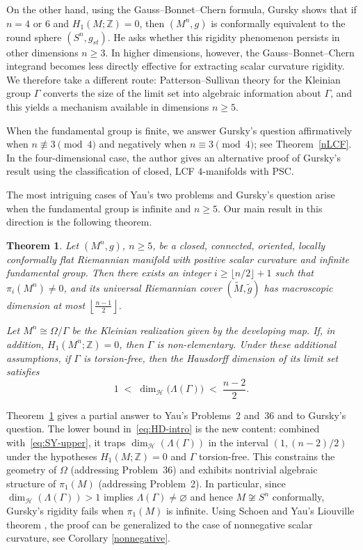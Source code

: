 \documentclass[12pt,oneside,a4paper]{article}
\newtheorem{theoremA}{Theorem}
\theoremstyle{mytheorem}
\theoremstyle{remark}
\theoremstyle{definition}
\begin{document}
On the other hand, using the Gauss--Bonnet--Chern formula, Gursky
\cite{zbMATH00750638} shows that if \(n=4\) or \(6\)
and \(H_1(M;\mathbb Z)=0\), then
\((M^n,g)\) is conformally equivalent to the round sphere
\((S^n,g_{st})\).  He asks whether this rigidity phenomenon
persists in other dimensions \(n\ge3\).  In higher dimensions, however,
the Gauss--Bonnet--Chern integrand becomes less directly effective for
extracting scalar curvature rigidity.  We therefore take a different
route: Patterson--Sullivan theory for the Kleinian group
\(\Gamma\) converts the size of the limit set into algebraic information
about \(\Gamma\), and this yields a mechanism available in dimensions
\(n\geq5\).

When the fundamental group is finite, we answer Gursky's question affirmatively when \(n\not\equiv3\pmod4\) and negatively when \(n\equiv3\pmod4\); see Theorem~\ref{nLCF}.
In the four-dimensional case, the author \cite[p.~12]{2025arXiv251213528D} gives an alternative proof of Gursky's result using the classification of closed, LCF $4$-manifolds with PSC.

The most intriguing cases of Yau's two problems and Gursky's question arise when the fundamental group is infinite and $n \ge 5$. Our main result in this direction is the following theorem.


\begin{theoremA}\label{thm:intro-A}
Let $(M^n,g)$, $n\geq5$, be a closed, connected, oriented, locally conformally
flat Riemannian manifold with positive scalar curvature and infinite
fundamental group.  Then there exists an integer
$i\ge\lfloor n/2\rfloor+1$ such that $\pi_i(M^n)\ne 0$, and its universal Riemannian cover $(\widetilde M,\widetilde g)$ has macroscopic dimension at most $\left\lfloor\frac{n-1}{2}\right\rfloor$.  
 
Let $M^n\cong\Omega/\Gamma$ be the Kleinian realization given by the
 developing map.  If, in addition,
$H_1(M^n;\mathbb{Z})=0$, then $\Gamma$ is
non-elementary.  Under these additional assumptions, if $\Gamma$ is
torsion-free, then the Hausdorff dimension of its limit set satisfies
\begin{equation}\label{eq:HD-intro}
        1\;<\;\dim_{\mathcal H}\!\bigl(\Lambda(\Gamma)\bigr)\;<\;\frac{n-2}{2}.
\end{equation}
\end{theoremA}

Theorem~\ref{thm:intro-A} gives a partial answer to Yau's Problems~2 and~36 and to
Gursky's question.  The lower bound in~\eqref{eq:HD-intro} is the new
content: combined with~\eqref{eq:SY-upper}, it traps
$\dim_{\mathcal H}(\Lambda(\Gamma))$ in the interval $(1,(n-2)/2)$
under the hypotheses $H_1(M;\mathbb{Z})=0$ and $\Gamma$ torsion-free.
This constrains the geometry of $\Omega$ (addressing Problem~36) and
exhibits nontrivial algebraic structure of $\pi_1(M)$ (addressing
Problem~2).   In particular, since $\dim_{\mathcal H}(\Lambda(\Gamma))>1$
implies $\Lambda(\Gamma)\ne\varnothing$ and hence $M\not\cong S^n$
conformally, Gursky's rigidity fails when $\pi_1(M)$ is infinite. Using  Schoen and Yau's Liouville theorem \cite{MR4836036}, the proof can be generalized to the
case of nonnegative scalar curvature, see Corollary \ref{nonnegative}.  
 
\end{document}
